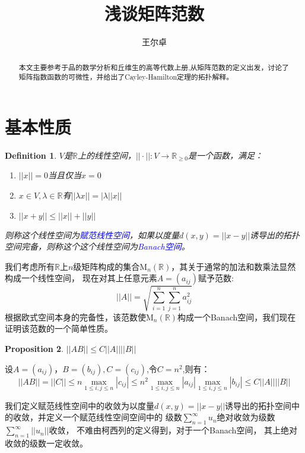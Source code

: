 \documentclass[a4paper,12pt]{ctexart}
\title{浅谈矩阵范数}
\author{王尔卓}
\newenvironment{prooff}{{\noindent\it\textcolor{cyan!40!black}{Proof}:}\quad}{\par}
\newtheorem{defn}{Definition}[section]
\newtheorem{prop}[defn]{Proposition}
\begin{document}
\maketitle
\begin{abstract}
    本文主要参考于品的数学分析和丘维生的高等代数上册,从矩阵范数的定义出发，讨论了矩阵指数函数的可微性，并给出了Cayley-Hamilton定理的拓扑解释。
\end{abstract}
\tableofcontents
\newpage
\section{基本性质}
\begin{defn}
    $V$是$\mathbb{R}$上的线性空间，$||\cdot||:V\rightarrow \mathbb{R}_{\ge 0}$是一个函数，满足：
    \begin{enumerate}
        \item $||x||=0$当且仅当$x=0$
        \item $x\in V,\lambda\in \mathbb{R}$有$||\lambda x||=|\lambda||x||$
        \item $||x+y||\le ||x||+||y||$
    \end{enumerate}
    则称这个线性空间为\textcolor{blue}{赋范线性空间}，如果以度量$d(x,y)=||x-y||$诱导出的拓扑空间完备，则称这个这个线性空间为\textcolor{blue}{Banach空间}。
\end{defn}
我们考虑所有$\mathbb{R}$上$n$级矩阵构成的集合$\text{M}_n(\mathbb{R})$，其关于通常的加法和数乘法显然构成一个线性空间，
现在对其上任意元素$A=(a_{ij})$赋予范数:
\begin{equation*}
    ||A||=\sqrt{\sum_{i=1}^{n}\sum_{j=1}^{n}a_{ij}^2}
\end{equation*}
根据欧式空间本身的完备性，该范数使$\text{M}_n(\mathbb{R})$构成一个Banach空间，我们现在证明该范数的一个简单性质。
\begin{prop}
    \label{prop:|AB|<=C|A||B|}
    $||AB||\le C||A||||B||$
\end{prop}
\begin{prooff}
    设$A=(a_{ij})，B=(b_{ij}),C=(c_{ij})$,令$C=n^2$,则有：\begin{equation*}
        ||AB||=||C||\le n\max_{1\le i,j \le n}|c_{ij}|
        \le n^2 \max_{1 \le i,j \le n} |a_{ij}| \max_{1\le i,j\le n}|b_{ij}| \le C||A||||B||
    \end{equation*}
\end{prooff}
我们定义赋范线性空间中的收敛为以度量$d(x,y)=||x-y||$诱导出的拓扑空间中的收敛，并定义一个赋范线性空间空间中的
级数$\sum_{n=1}^{\infty}u_n$绝对收敛为级数$\sum_{n=1}^{\infty}||u_n||$收敛，
不难由柯西列的定义得到，对于一个Banach空间，
其上绝对收敛的级数一定收敛。
\end{document}
